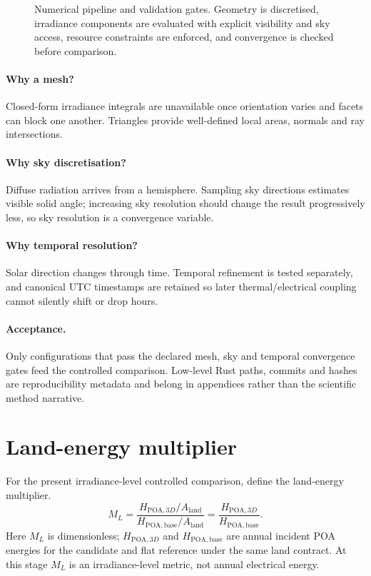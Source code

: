 \documentclass[11pt,a4paper]{article}
\begin{document}
\begin{figure}[htbp]\centering

\caption{Numerical pipeline and validation gates. Geometry is discretised, irradiance components are evaluated with explicit visibility and sky access, resource constraints are enforced, and convergence is checked before comparison.}
\label{fig:numerical-method-flow}\end{figure}

\paragraph{Why a mesh?} Closed-form irradiance integrals are unavailable once orientation varies and facets can block one another. Triangles provide well-defined local areas, normals and ray intersections.

\paragraph{Why sky discretisation?} Diffuse radiation arrives from a hemisphere. Sampling sky directions estimates visible solid angle; increasing sky resolution should change the result progressively less, so sky resolution is a convergence variable.

\paragraph{Why temporal resolution?} Solar direction changes through time. Temporal refinement is tested separately, and canonical UTC timestamps are retained so later thermal/electrical coupling cannot silently shift or drop hours.

\paragraph{Acceptance.} Only configurations that pass the declared mesh, sky and temporal convergence gates feed the controlled comparison. Low-level Rust paths, commits and hashes are reproducibility metadata and belong in appendices rather than the scientific method narrative.

\section{Land-energy multiplier}
For the present irradiance-level controlled comparison, define the land-energy multiplier.
\begin{equation}
M_L=\frac{H_{\mathrm{POA},3D}/A_{\mathrm{land}}}{H_{\mathrm{POA,base}}/A_{\mathrm{land}}}=\frac{H_{\mathrm{POA},3D}}{H_{\mathrm{POA,base}}}.
\label{eq:land-multiplication-definition}
\end{equation}
Here \(M_L\) is dimensionless; \(H_{\mathrm{POA},3D}\) and \(H_{\mathrm{POA,base}}\) are annual incident POA energies for the candidate and flat reference under the same land contract. At this stage \(M_L\) is an irradiance-level metric, not annual electrical energy.
\end{document}
